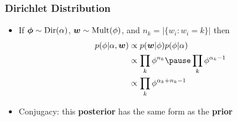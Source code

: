 \fi
\ifconjugacy

\begin{frame}
\frametitle{Dirichlet Distribution}
\begin{itemize}
  \item If ${\mbox{\boldmath$\phi$}} \sim \mathrm{Dir}(\alpha)$, ${\mbox{\boldmath$w$}} \sim \mathrm{Mult}(\phi)$, and $n_k = |\{ w_i : w_i = k\}|$ then
  \begin{align}
  	p(\phi | \alpha, {\bm w}) & \propto p({\bm w} | \phi) p(\phi | \alpha) \\
	                       & \propto  \prod_{k} \phi^{n_k} \pause  \prod_k { \phi^{\alpha_k - 1}} \\
	                       & \propto \prod_k \phi^{\alpha_k + n_k - 1}
  \end{align}
  \item Conjugacy: this {\bf posterior} has the same form as the {\bf prior}
\end{itemize}
\end{frame}

\fi

\ifhighlevel

\else


